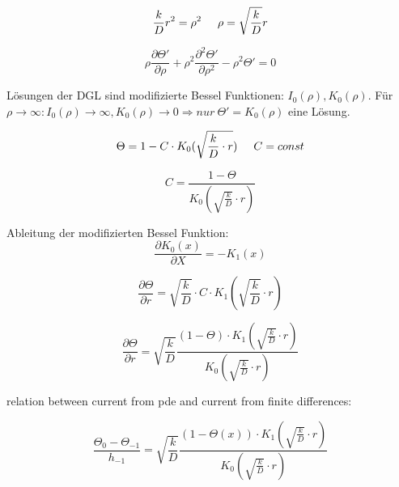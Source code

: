 \begin{equation}
\frac{k}{D}r^2 = \rho^2 \hspace{0.5cm} \rho = \sqrt{\frac{k}{D}}r
\end{equation}

\begin{equation}
\rho\frac{\partial\Theta'}{\partial \rho} + \rho^2\frac{\partial^2\Theta'}{\partial \rho^2} - \rho^2\Theta' = 0
\end{equation}

L\"osungen der DGL sind modifizierte Bessel Funktionen: \begin{math} I_0(\rho), K_0(\rho) \end{math}. F\"ur \begin{math} \rho \to \infty: I_0(\rho) \to \infty, K_0(\rho) \to 0 \Rightarrow nur~ \Theta' = K_0(\rho) \end{math} eine L\"osung.

\begin{equation}
\Theta = 1 - C\cdot K_0(\sqrt{\frac{k}{D}\cdot r}) \hspace{0.5cm} C = const
\end{equation}

\begin{equation}
C = \frac{1-\Theta}{K_0(\sqrt{\frac{k}{D}}\cdot r)}
\end{equation}

Ableitung der modifizierten Bessel Funktion:
\begin{equation}
\frac{\partial K_0(x)}{\partial X} = - K_1(x)
\end{equation}

\begin{equation}
\frac{\partial \Theta}{\partial r} = \sqrt{\frac{k}{D}}\cdot C \cdot K_1(\sqrt{\frac{k}{D}}\cdot r)
\end{equation}

\begin{equation}
\frac{\partial \Theta}{\partial r} = \sqrt{\frac{k}{D}} \frac{(1-\Theta)\cdot K_1(\sqrt{\frac{k}{D}}\cdot r)}{K_0(\sqrt{\frac{k}{D}}\cdot r)}
\end{equation}

relation between current from pde and current from finite differences:

\begin{equation}
\frac{\Theta_0 - \Theta_{-1}}{h_{-1}} = \sqrt{\frac{k}{D}} \frac{(1-\Theta(x))\cdot K_1(\sqrt{\frac{k}{D}}\cdot r)}{K_0(\sqrt{\frac{k}{D}}\cdot r)}
\end{equation}

